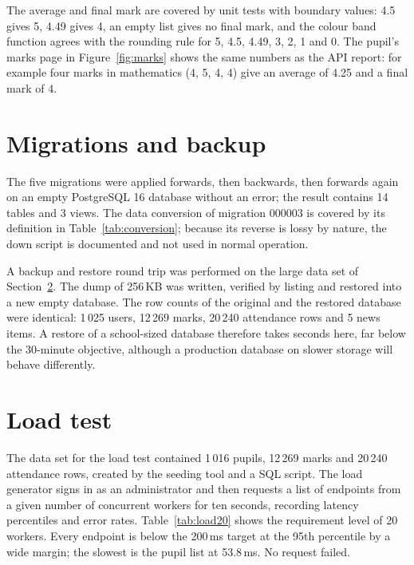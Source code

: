 The average and final mark are covered by unit tests with boundary values: 4.5 gives 5, 4.49 gives 4, an empty list gives no final mark, and the colour band function agrees with the rounding rule for 5, 4.5, 4.49, 3, 2, 1 and 0. The pupil's marks page in Figure~\ref{fig:marks} shows the same numbers as the API report: for example four marks in mathematics (4, 5, 4, 4) give an average of 4.25 and a final mark of 4.

\section{Migrations and backup}
\label{sec:backup}

The five migrations were applied forwards, then backwards, then forwards again on an empty PostgreSQL 16 database without an error; the result contains 14 tables and 3 views. The data conversion of migration 000003 is covered by its definition in Table~\ref{tab:conversion}; because its reverse is lossy by nature, the down script is documented and not used in normal operation.

A backup and restore round trip was performed on the large data set of Section~\ref{sec:load}. The dump of 256\,KB was written, verified by listing and restored into a new empty database. The row counts of the original and the restored database were identical: 1\,025 users, 12\,269 marks, 20\,240 attendance rows and 5 news items. A restore of a school-sized database therefore takes seconds here, far below the 30-minute objective, although a production database on slower storage will behave differently.

\section{Load test}
\label{sec:load}

The data set for the load test contained 1\,016 pupils, 12\,269 marks and 20\,240 attendance rows, created by the seeding tool and a SQL script. The load generator signs in as an administrator and then requests a list of endpoints from a given number of concurrent workers for ten seconds, recording latency percentiles and error rates. Table~\ref{tab:load20} shows the requirement level of 20 workers. Every endpoint is below the 200\,ms target at the 95th percentile by a wide margin; the slowest is the pupil list at 53.8\,ms. No request failed.

